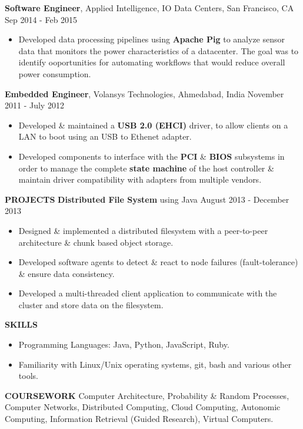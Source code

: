 \documentclass[10pt, letterpaper]{article}
\begin{document}
\textbf{Software Engineer}, Applied Intelligence, IO Data Centers, San Francisco, CA \hfill Sep 2014 - Feb 2015
\begin{itemize}
    \item Developed data processing pipelines using \textbf{Apache Pig} to analyze sensor data that monitors the power characteristics of a datacenter. The goal was to identify ooportunities for automating workflows that would reduce overall power consumption.
\end{itemize}

\textbf{Embedded Engineer}, Volansys Technologies, Ahmedabad, India \hfill November 2011 - July 2012
\begin{itemize}
\item Developed \& maintained a \textbf{USB 2.0 (EHCI)} driver, to allow clients on a LAN to boot using an USB to Ethenet adapter.
\item Developed components to interface with the \textbf{PCI} \& \textbf{BIOS} subsystems in order to manage the complete \textbf{state machine} of the host controller \& maintain driver compatibility with adapters from multiple vendors. 
\end{itemize}

\textbf{PROJECTS}
\smallskip 
\newline
\textbf{Distributed File System} using Java \hfill August 2013 - December 2013
\begin{itemize}
\item Designed \& implemented a distributed filesystem with a peer-to-peer architecture \& chunk based object storage.
\item Developed software agents to detect \& react to node failures (fault-tolerance) \& ensure data consistency.
\item Developed a multi-threaded client application to communicate with the cluster and store data on the filesystem.
\end{itemize}

\textbf{SKILLS}
\smallskip 
\begin{itemize}
    \item Programming Languages: Java, Python, JavaScript, Ruby.
    \item Familiarity with Linux/Unix operating systems, git, bash and various other tools.
\end{itemize} 

\textbf{COURSEWORK}
\smallskip 
\newline
Computer Architecture, Probability \& Random Processes, Computer Networks, Distributed Computing, Cloud Computing, Autonomic Computing, Information Retrieval (Guided Research), Virtual Computers.
\end{document}
